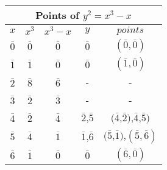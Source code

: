\begin{tabular}{ |c||c|c|c|c|   }
 \hline
 \multicolumn{5}{|c|}{Points of $y^2=x^3-x$} \\
 \hline
 $x$ & $x^3$ & $x^3-x$ & $y$ & $points$ \\
 \hline
 $\bar{0}$   & $\bar{0}$   & $\bar{0}$ & $\bar{0}$ & $(\bar{0},\bar{0})$ \\
 $\bar{1}$ & $\bar{1}$ & $\bar{0}$ & $\bar{0}$ & $(\bar{1},\bar{0})$ \\
 $\bar{2}$ & $\bar{8}$ & $\bar{6}$ & - & - \\
 $\bar{3}$ & $\bar{2}$ & $\bar{3}$ & - & - \\
 $\bar{4}$ & $\bar{2}$ & $\bar{4}$ & $\bar{2}$,$\bar{5}$ & $(\bar{4}$,$\bar{2})$,$\bar{4}$,$\bar{5})$ \\
 $\bar{5}$ & $\bar{4}$ & $\bar{1}$ & $\bar{1}$,$\bar{6}$ & $(\bar{5}$,$\bar{1})$,$(\bar{5},\bar{6})$ \\
 $\bar{6}$ & $\bar{1}$ & $\bar{0}$ & $\bar{0}$ & $(\bar{6},\bar{0})$ \\
 \hline
\end{tabular}